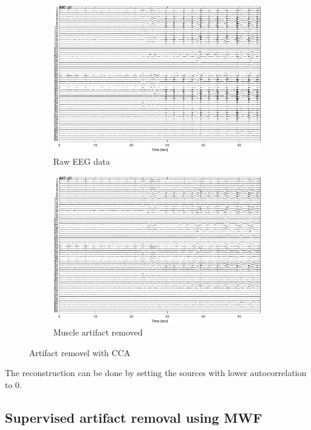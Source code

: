 \documentclass[pagesize,english,DIV=calc,footinclude=false
]{scrartcl}
\begin{document}
\begin{figure}[htbp]
  \centering
  \begin{subfigure}[b]{0.48\linewidth}
    \includegraphics[width=\linewidth]{eeg_arti.eps}
    \caption{Raw EEG data}
  \end{subfigure}
  \begin{subfigure}[b]{0.48\linewidth}
    \includegraphics[width=\linewidth]{eeg_arti_rmv.eps}
    \caption{Muscle artifact removed}
  \end{subfigure}
  \caption{Artifact removel with CCA}
  \label{fig:arti_rmv}
\end{figure}

The reconstruction can be done by setting the sources with lower autocorrelation to 0.

\subsection{Supervised artifact removal using MWF}
\end{document}
